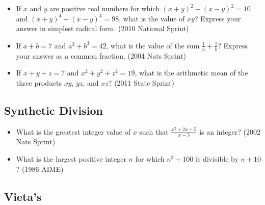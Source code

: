\documentclass{article}
\begin{document}
\begin{itemize}
\item If $x$ and $y$ are positive real numbers for which $(x+y)^2+(x-y)^2=10$ and $(x+y)^4+(x-y)^4=98$, what is the value of $xy$? Express your answer in simplest radical form. (2010 National Sprint)

\item If $a+b=7$ and $a^3+b^3=42$, what is the value of the sum $\frac{1}{a}+\frac{1}{b}$? Express your answer as a common fraction. (2004 Nats Sprint)

\item If $x+y+z=7$ and $x^2+y^2+z^2=19$, what is the arithmetic mean of the three products $xy$, $yz$, and $xz$? (2011 State Sprint)

\end{itemize}

\subsection{Synthetic Division}

\begin{itemize}
\item What is the greatest integer value of $x$ such that $\frac{x^2+2x+5}{x-3}$ is an integer? (2002 Nats Sprint)

\item What is the largest positive integer $n$ for which $n^3+100$ is divisible by $n+10$? (1986 AIME)
\end{itemize}


\subsection{Vieta's}
\end{document}
